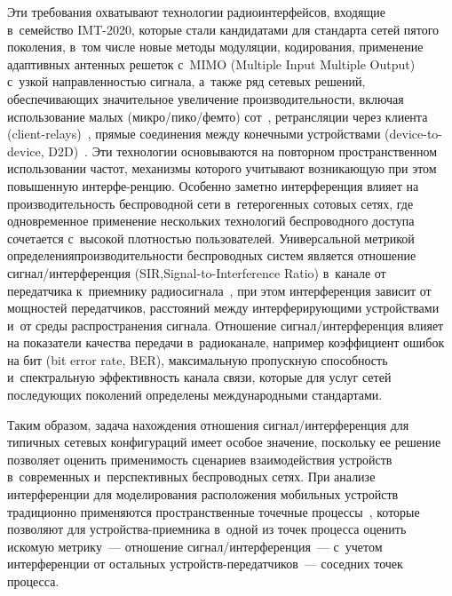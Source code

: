 \begin{multicols}{2}
  Эти требования охватывают технологии радиоинтерфейсов, входящие 
в~семейство IMT-2020, кото\-рые стали кандидатами для стандарта сетей 
пято\-го поколения, в~том числе новые методы модуляции, кодирования, 
применение адаптивных антенных решеток с~MIMO (Multiple Input Multiple 
Output) с~узкой направленностью сигнала, а~также ряд сетевых решений, 
обеспечивающих значительное увеличение производительности, включая 
использование малых (микро/пико/фемто) сот~\cite{6-gai}, ретрансляции 
через клиента (client-relays)~\cite{7-gai}, прямые соединения между 
конечными устройствами (device-to-device, D2D)~\cite{8-gai}. Эти 
технологии основываются на повторном пространственном использовании 
частот, механизмы которого учитывают возникающую при этом 
повышенную интерфе-\linebreak ренцию. Особенно заметно интерференция влияет на
производительность беспроводной сети в~гетерогенных сотовых сетях, где 
одновременное применение нескольких технологий беспроводного\linebreak
 доступа 
сочетается с~высокой плотностью пользователей. Универсальной метрикой 
определения\linebreak производительности беспроводных систем явля\-ется отношение 
сигнал/интерференция (SIR,\linebreak Signal-to-Interference Ratio) в~канале от 
передатчика к~приемнику радиосигнала~\cite{9-gai}, при этом 
интерференция зависит от мощностей передатчиков, расстояний между 
интерферирующими устройствами и~от среды распространения сигнала. 
Отношение сиг\-нал/ин\-тер\-фе\-рен\-ция влияет на показатели качества 
передачи в~радиоканале, например коэффициент ошибок на бит (bit error 
rate, BER), максимальную пропускную способность и~спектральную 
эффективность канала связи, которые для услуг сетей последующих 
поколений определены международными стандартами.
  
  Таким образом, задача нахождения отношения  
сиг\-нал/ин\-тер\-фе\-рен\-ция для типичных сетевых конфигураций имеет 
особое значение, поскольку ее решение позволяет оценить применимость 
сценариев взаимодействия устройств в~современных и~перспективных 
беспроводных сетях. При анализе интерференции для моделирования 
расположения мобильных устройств традиционно применяются 
пространственные точечные процессы~\cite{10-gai}, которые позволяют для 
устрой\-ст\-ва-при\-ем\-ни\-ка в~одной из точек процесса оценить искомую 
метрику~--- отношение сиг\-нал/ин\-тер\-фе\-рен\-ция~--- с~учетом 
интерференции от остальных устройств-пе\-ре\-дат\-чи\-ков~--- соседних 
точек процесса. 


\end{multicols}
